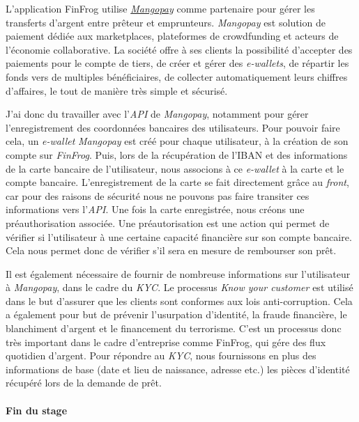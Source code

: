 \documentclass[12pt,a4paper]{article}
\begin{document}
  L'application FinFrog utilise
  \href{https://www.mangopay.com/fr/}{\emph{Mangopay}} comme partenaire
  pour gérer les transferts d'argent entre prêteur et emprunteurs.
  \emph{Mangopay} est solution de paiement dédiée aux marketplaces,
  plateformes de crowdfunding et acteurs de l'économie collaborative. La
  société offre à ses clients la possibilité d'accepter des paiements pour
  le compte de tiers, de créer et gérer des \emph{e-wallets}, de répartir
  les fonds vers de multiples bénéficiaires, de collecter automatiquement
  leurs chiffres d'affaires, le tout de manière très simple et sécurisé.

  \bigskip

  J'ai donc du travailler avec l'\emph{API} de \emph{Mangopay}, notamment
  pour gérer l'enregistrement des coordonnées bancaires des utilisateurs.
  Pour pouvoir faire cela, un \emph{e-wallet} \emph{Mangopay} est créé
  pour chaque utilisateur, à la création de son compte sur \emph{FinFrog}.
  Puis, lors de la récupération de l'IBAN et des informations de la carte
  bancaire de l'utilisateur, nous associons à ce \emph{e-wallet} à la
  carte et le compte bancaire. L'enregistrement de la carte se fait
  directement grâce au \emph{front}, car pour des raisons de sécurité nous
  ne pouvons pas faire transiter ces informations vers l'\emph{API}. Une
  fois la carte enregistrée, nous créons une préauthorisation associée.
  Une préautorisation est une action qui permet de vérifier si
  l'utilisateur à une certaine capacité financière sur son compte
  bancaire. Cela nous permet donc de vérifier s'il sera en mesure de
  rembourser son prêt.

  \bigskip

  Il est également nécessaire de fournir de nombreuse informations sur
  l'utilisateur à \emph{Mangopay}, dans le cadre du \emph{KYC}. Le
  processus \emph{Know your customer} est utilisé dans le but d'assurer
  que les clients sont conformes aux lois anti-corruption. Cela a
  également pour but de prévenir l'usurpation d'identité, la fraude
  financière, le blanchiment d'argent et le financement du terrorisme.
  C'est un processus donc très important dans le cadre d'entreprise comme
  FinFrog, qui gére des flux quotidien d'argent. Pour répondre au
  \emph{KYC}, nous fournissons en plus des informations de base (date et
  lieu de naissance, adresse etc.) les pièces d'identité récupéré lors de
  la demande de prêt.

  \bigskip

  \paragraph{Fin du stage}\label{fin-du-stage}
\end{document}
